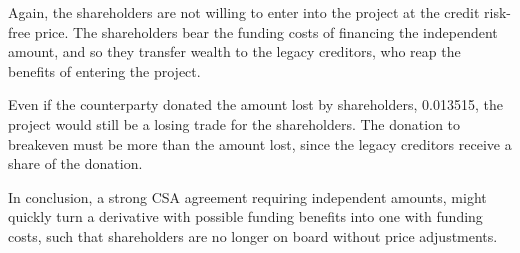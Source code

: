\documentclass[main.tex]{subfiles}
\begin{document}
        Again, the shareholders are not willing to enter into the project 
        at the credit risk-free price.
        The shareholders bear the funding costs of financing the independent amount,
        and so they transfer wealth to the legacy creditors, 
        who reap the benefits of entering the project.
        
        Even if the counterparty donated the amount lost by shareholders, \num{0.013515},
        the project would still be a losing trade for the shareholders.
        The donation to breakeven must be more than the amount lost,
        since the legacy creditors receive a share of the donation. 

        In conclusion, a strong CSA agreement requiring independent amounts, 
        might quickly turn a derivative with possible funding benefits into one with funding costs, 
        such that shareholders are no longer on board without price adjustments.
\end{document}
